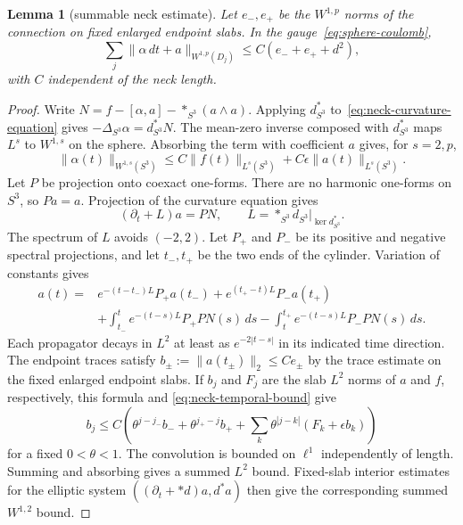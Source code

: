 \documentclass[11pt]{amsart}
\newtheorem{lemma}[theorem]{Lemma}
\theoremstyle{definition}
\theoremstyle{remark}
\theoremstyle{plain}
\begin{document}
\begin{lemma}[summable neck estimate]\label{lem:two-sided-cylinder}
Let $e_-,e_+$ be the $W^{1,p}$ norms of the connection on fixed
enlarged endpoint slabs.  In the gauge~\eqref{eq:sphere-coulomb},
\begin{equation}\label{eq:cylinder-l1}
 \sum_j\|\alpha\,dt+a\|_{W^{1,p}(D_j)}
 \le C(e_-+e_++d^2),
\end{equation}
with $C$ independent of the neck length.
\end{lemma}
\begin{proof}
Write $N=f-[\alpha,a]-*_{S^3}(a\wedge a)$.  Applying $d_{S^3}^*$
to~\eqref{eq:neck-curvature-equation} gives
$-\Delta_{S^3}\alpha=d_{S^3}^*N$.
The mean-zero inverse composed with $d_{S^3}^*$ maps $L^s$ to
$W^{1,s}$ on the sphere.  Absorbing the term with coefficient $a$
gives, for $s=2,p$,
\begin{equation}\label{eq:neck-temporal-bound}
 \|\alpha(t)\|_{W^{1,s}(S^3)}
 \le C\|f(t)\|_{L^s(S^3)}
       +C\epsilon\|a(t)\|_{L^s(S^3)}.
\end{equation}
Let $P$ be projection onto coexact one-forms.  There are no harmonic
one-forms on $S^3$, so $Pa=a$.  Projection of the curvature equation
gives
\begin{equation}\label{eq:neck-coexact-equation}
 (\partial_t+L)a=PN,
 \qquad L=*_{S^3}d_{S^3}|_{\ker d_{S^3}^*}.
\end{equation}
The spectrum of $L$ avoids $(-2,2)$.  Let $P_+$ and $P_-$ be its
positive and negative spectral projections, and let $t_-,t_+$ be
the two ends of the cylinder.  Variation of constants gives
\begin{align*}
 a(t)={}&e^{-(t-t_-)L}P_+a(t_-)
       +e^{(t_+-t)L}P_-a(t_+)\\
 &+\int_{t_-}^{t}e^{-(t-s)L}P_+PN(s)\,ds
       -\int_t^{t_+}e^{-(t-s)L}P_-PN(s)\,ds.
\end{align*}
Each propagator decays in $L^2$ at least as $e^{-2|t-s|}$ in
its indicated time direction.  The endpoint traces satisfy
$b_\pm:=\|a(t_\pm)\|_2\leq Ce_\pm$ by the trace estimate on
the fixed enlarged endpoint slabs.  If $b_j$ and $F_j$ are the
slab $L^2$ norms of $a$ and $f$, respectively, this formula and
\eqref{eq:neck-temporal-bound} give
\begin{equation}\label{eq:three-annulus}
 b_j\le C\left(\theta^{j-j_-}b_-+
 \theta^{j_+-j}b_++\sum_k\theta^{|j-k|}(F_k+\epsilon b_k)\right)
\end{equation}
for a fixed $0<\theta<1$.
The convolution is bounded on $\ell^1$ independently of length.
Summing and absorbing gives a summed $L^2$ bound.  Fixed-slab
interior estimates for the elliptic system
$((\partial_t+*d)a,d^*a)$ then give the corresponding summed
$W^{1,2}$ bound.


\end{proof}
\end{document}
